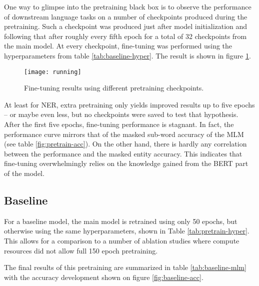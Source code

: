 \documentclass[main.tex]{subfiles}
\begin{document}
One way to glimpse into the pretraining black box is to observe the performance of downstream language tasks on a number of checkpoints produced during the pretraining.
Such a checkpoint was produced just after model initialization and following that after roughly every fifth epoch for a total of 32 checkpoints from the main model.
At every checkpoint, fine-tuning was performed using the hyperparameters from table \ref{tab:baseline-hyper}.
The result is shown in figure \ref{fig:running}.
\begin{figure}[H]
    \centering
    \texttt{[image: running]}
    \caption{Fine-tuning results using different pretraining checkpoints.}
    \label{fig:running}
\end{figure}\noindent
At least for NER, extra pretraining only yields improved results up to five epochs -- or maybe even less, but no checkpoints were saved to test that hypothesis.
After the first five epochs, fine-tuning performance is stagnant.
In fact, the performance curve mirrors that of the masked sub-word accuracy of the MLM (see table \ref{fig:pretrain-acc}).
On the other hand, there is hardly any correlation between the performance and the masked entity accuracy.
This indicates that fine-tuning overwhelmingly relies on the knowledge gained from the BERT part of the model.

\subsection{Baseline}
For a baseline model, the main model is retrained using only 50 epochs, but otherwise using the same hyperparameters, shown in Table \ref{tab:pretrain-hyper}.
This allows for a comparison to a number of ablation studies where compute resources did not allow full 150 epoch pretraining.

The final results of this pretraining are summarized in table \ref{tab:baseline-mlm} with the accuracy development shown on figure \ref{fig:baseline-acc}.
\end{document}
